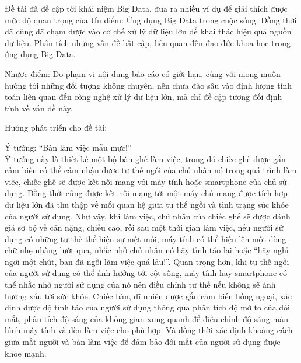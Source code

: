 \documentclass[12pt]{report}
\begin{document}
Đề tài đã đề cập tới khái niệm Big Data, đưa ra nhiều ví dụ để giải thích được mức độ quan trọng của Ưu điểm: Ứng dụng Big Data trong cuộc sống. Đồng thời đã cũng đã chạm được vào cơ chế xử lý dữ liệu lớn để khai thác hiệu quả nguồn dữ liệu. Phân tích những vấn đề bất cập, liên quan đến đạo đức khoa học trong ứng dụng Big Data. 

Nhược điểm: Do phạm vi nội dung báo cáo có giới hạn, cùng với mong muốn hướng tới những đối tượng không chuyên, nên chưa đào sâu vào định lượng tính toán liên quan đến công nghệ xử lý dữ liệu lớn, mà chỉ đề cập tương đối định tính về vấn đề này.

Hướng phát triển cho đề tài: 

Ý tưởng: “Bàn làm việc mẫu mực!” \\
Ý tưởng này là thiết kế một bộ bàn ghế làm việc, trong đó chiếc ghế được gắn cảm biến có thể cảm nhận được tư thế ngồi của chủ nhân nó trong quá trình làm việc, chiếc ghế sẽ được kết nối mạng với máy tính hoặc smartphone của chủ sử dụng. Đồng thời cũng được kết nối mạng tới một máy chủ mạng được tích hợp dữ liệu lớn đã thu thập về mối quan hệ giữa tư thế ngồi và tình trạng sức khỏe của người sử dụng. Như vậy, khi làm việc, chủ nhân của chiếc ghế sẽ được đánh giá sơ bộ về cân nặng, chiều cao, rồi sau một thời gian làm việc, nếu người sử dụng có những tư thế thể hiện sự mệt mỏi, máy tính có thể hiện lên một dòng chữ nhẹ nhàng lướt qua, nhắc nhở chủ nhân nó hãy tỉnh táo lại hoặc “hãy nghỉ ngơi một chút, bạn đã ngồi làm việc quá lâu!”. Quan trọng hơn, khi tư thế ngồi của người sử dụng có thể ảnh hưởng tới cột sống, máy tính hay smartphone có thể nhắc nhở người sử dụng của nó nên điều chỉnh tư thế nếu không sẽ ảnh hưởng xấu tới sức khỏe. Chiếc bàn, dĩ nhiên được gắn cảm biến hồng ngoại, xác định được độ tỉnh táo của người sử dụng thông qua phân tích độ mở to của đôi mắt, phân tích độ sáng của không gian xung quanh để điều chỉnh độ sáng màn hình máy tính và đèn làm việc cho phù hợp. Và đồng thời xác định khoảng cách giữa mắt người và bàn làm việc để đảm bảo đôi mắt của người sử dụng được khỏe mạnh.
\end{document}
